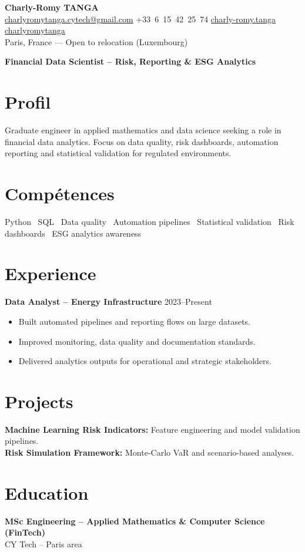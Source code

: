 \documentclass[10pt, letterpaper]{article}
\begin{document}
\begin{center}
\textbf{\LARGE Charly-Romy TANGA}\\[0.15cm]
\mbox{\href{mailto:charlyromytanga.cytech@gmail.com}{\footnotesize\faEnvelope\hspace*{0.1cm}charlyromytanga.cytech@gmail.com}}\kern0.25cm
\mbox{\faPhone\hspace*{0.1cm}+33 6 15 42 25 74}\kern0.25cm
\mbox{\href{https://www.linkedin.com/in/charly-romy-tanga}{\footnotesize\faLinkedin\hspace*{0.1cm}charly-romy.tanga}}\kern0.25cm
\mbox{\href{https://github.com/charlyromytanga}{\footnotesize\faGithub\hspace*{0.1cm}charlyromytanga}}\\[0.15cm]
Paris, France --- Open to relocation (Luxembourg)
\end{center}
\textbf{Financial Data Scientist -- Risk, Reporting \& ESG Analytics}
\section*{Profil}
Graduate engineer in applied mathematics and data science seeking a role in financial data analytics. Focus on data quality, risk dashboards, automation reporting and statistical validation for regulated environments.
\section*{Compétences}
Python \textbullet\ SQL \textbullet\ Data quality \textbullet\ Automation pipelines \textbullet\ Statistical validation \textbullet\ Risk dashboards \textbullet\ ESG analytics awareness
\section*{Experience}
\textbf{Data Analyst -- Energy Infrastructure} \hfill 2023--Present
\begin{itemize}[leftmargin=0.45cm,itemsep=1pt,topsep=2pt]
\item Built automated pipelines and reporting flows on large datasets.
\item Improved monitoring, data quality and documentation standards.
\item Delivered analytics outputs for operational and strategic stakeholders.
\end{itemize}
\section*{Projects}
\textbf{Machine Learning Risk Indicators:} Feature engineering and model validation pipelines.\\
\textbf{Risk Simulation Framework:} Monte-Carlo VaR and scenario-based analyses.
\section*{Education}
\textbf{MSc Engineering -- Applied Mathematics \& Computer Science (FinTech)}\\CY Tech -- Paris area
\end{document}
